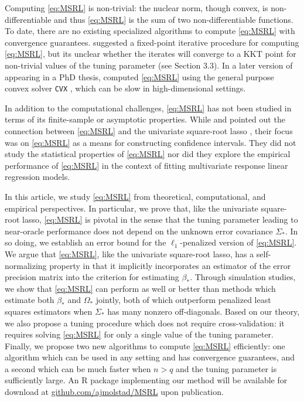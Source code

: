 \documentclass[12pt]{article}
\begin{document}
Computing \eqref{eq:MSRL} is non-trivial: the nuclear norm, though convex, is non-differentiable and thus \eqref{eq:MSRL} is the sum of two non-differentiable functions. To date, there are no existing specialized algorithms to compute \eqref{eq:MSRL} with convergence guarantees. \citet{van2016chi2} suggested a fixed-point iterative procedure for computing \eqref{eq:MSRL}, but its unclear whether the iterates will converge to a KKT point for non-trivial values of the tuning parameter (see Section 3.3). 
In a later version of \citet{van2016chi2} appearing in a PhD thesis, \citet{stucky2017asymptotic} computed \eqref{eq:MSRL} using the general purpose convex solver \texttt{CVX} \citep{cvx}, which can be slow in high-dimensional settings. 

In addition to the computational challenges, \eqref{eq:MSRL} has not been studied in terms of its finite-sample or asymptotic properties. While \citet{van2016chi2} and \citet{van2016estimation} pointed out the connection between \eqref{eq:MSRL} and the univariate square-root lasso \citep{belloni2011square}, their focus was on \eqref{eq:MSRL} as a means for constructing confidence intervals. They did not study the statistical properties of \eqref{eq:MSRL} nor did they explore the empirical performance of \eqref{eq:MSRL} in the context of fitting multivariate response linear regression models. 

In this article, we study \eqref{eq:MSRL} from theoretical, computational, and empirical perspectives. In particular, we prove that, like the univariate square-root lasso, \eqref{eq:MSRL} is pivotal in the sense that the tuning parameter leading to near-oracle performance does not depend on the unknown error covariance $\Sigma_*$. In so doing, we establish an error bound for the $\ell_1$-penalized version of \eqref{eq:MSRL}. We argue that \eqref{eq:MSRL}, like the univariate square-root lasso, has a self-normalizing property in that it implicitly incorporates an estimator of the error precision matrix into the criterion for estimating $\beta_*$. 
Through simulation studies, we show that \eqref{eq:MSRL} can perform as well or better than methods which estimate both $\beta_*$ and $\Omega_*$ jointly, both of which outperform penalized least squares estimators when $\Sigma_*$ has many nonzero off-diagonals. Based on our theory, we also propose a tuning procedure which does not require cross-validation: it requires solving \eqref{eq:MSRL} for only a single value of the tuning parameter. Finally, we propose two new algorithms to compute \eqref{eq:MSRL} efficiently: one algorithm which can be used in any setting and has convergence guarantees, and a second which can be much faster when $n > q$ and the tuning parameter is sufficiently large. An R package implementing our method will be available for download at \href{http://github.com/ajmolstad/MSRL}{github.com/ajmolstad/MSRL} upon publication. 
\end{document}
